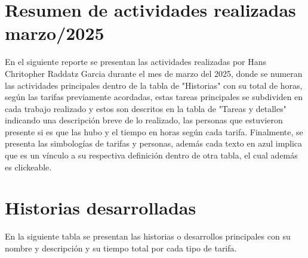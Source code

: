 \documentclass{article}
\begin{document}
\section*{Resumen de actividades realizadas marzo/2025}

En el siguiente reporte se presentan las actividades realizadas por Hans Chritopher Raddatz Garcia durante el mes de marzo del 2025, donde se numeran las actividades principales dentro de la tabla de "Historias" con su total de horas, según las tarifas previamente acordadas, estas tareas principales se subdividen en cada trabajo realizado y estos son descritos en la tabla de "Tareas y detalles" indicando una descripción breve de lo realizado, las personas que estuvieron presente si es que las hubo y el tiempo en horas según cada tarifa.
Finalmente, se presenta las simbologías de tarifas y personas, además cada texto en azul implica que es un vínculo a su respectiva definición dentro de otra tabla, el cual además es clickeable. 

\section{Historias desarrolladas}
En la siguiente tabla se presentan las historias o desarrollos principales con su nombre y descripción y su tiempo total por cada tipo de tarifa.
\end{document}
